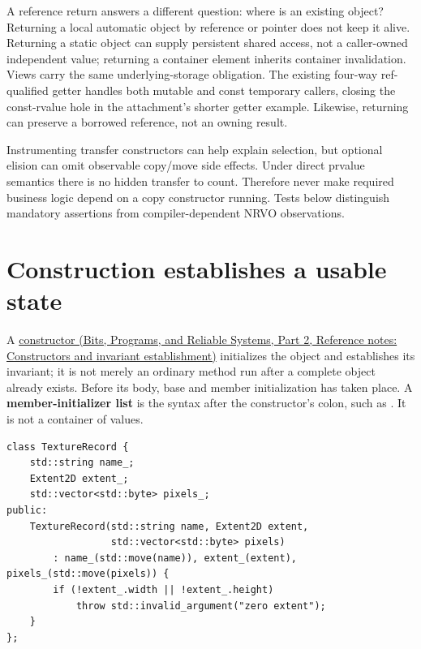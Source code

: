 A reference return answers a different question: where is an existing object? Returning a local automatic object by reference or pointer does not keep it alive. Returning a static object can supply persistent shared access, not a caller-owned independent value; returning a container element inherits container invalidation. Views carry the same underlying-storage obligation. The existing four-way ref-qualified getter handles both mutable and const temporary callers, closing the const-rvalue hole in the attachment's shorter getter example. Likewise,  returning  can preserve a borrowed reference, not an owning result.

Instrumenting transfer constructors can help explain selection, but optional elision can omit observable copy/move side effects. Under direct prvalue semantics there is no hidden transfer to count. Therefore never make required business logic depend on a copy constructor running. Tests below distinguish mandatory assertions from compiler-dependent NRVO observations.

\section{Construction establishes a usable state}\label{05-engine-i-ch003-construction-establishes-a-usable-state}

\hypertarget{05-engine-i-ch003-construction-establishes-a-usable-state}{}

A \href{../01-Bits-Programs-and-Reliable-Systems-P02/main.pdf\#appendix-7f8ec83d0886}{constructor (Bits, Programs, and Reliable Systems, Part 2, Reference notes: Constructors and invariant establishment)} initializes the object and establishes its invariant; it is not merely an ordinary method run after a complete object already exists. Before its body, base and member initialization has taken place. A \textbf{member-initializer list} is the syntax after the constructor's colon, such as . It is not a  container of values.

\begin{verbatim}
class TextureRecord {
    std::string name_;
    Extent2D extent_;
    std::vector<std::byte> pixels_;
public:
    TextureRecord(std::string name, Extent2D extent,
                  std::vector<std::byte> pixels)
        : name_(std::move(name)), extent_(extent), pixels_(std::move(pixels)) {
        if (!extent_.width || !extent_.height)
            throw std::invalid_argument("zero extent");
    }
};
\end{verbatim}


